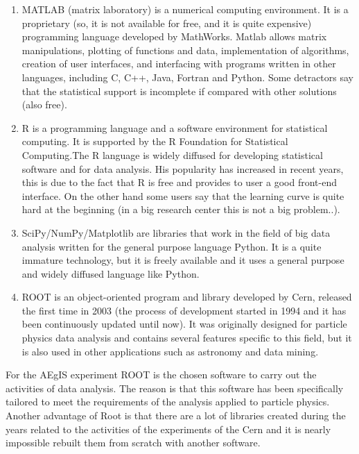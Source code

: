 \begin{enumerate}

\item MATLAB (matrix laboratory) is a numerical computing environment. It is a proprietary (so, it is not available for free, and it is quite expensive) programming language developed by MathWorks. Matlab allows matrix manipulations, plotting of functions and data, implementation of algorithms, creation of user interfaces, and interfacing with programs written in other languages, including C, C++, Java, Fortran and Python. 
Some detractors say that the statistical support is incomplete if compared with other solutions (also free).

\item R is a programming language and a software environment for statistical computing. It is supported by the R Foundation for Statistical Computing.The R language is widely diffused for developing statistical software and for data analysis. His popularity has increased in recent years, this is due to the fact that R is free and provides to user a good front-end interface. On the other hand some users say that the learning curve is quite hard at the beginning (in a big research center this is not a big problem..).  

\item SciPy/NumPy/Matplotlib are libraries that work in the field of big data analysis written for the general purpose language Python. It is a quite immature technology, but it is freely available and it uses a general purpose and widely diffused language like Python.

\item ROOT is an object-oriented program and library developed by Cern, released the first time in 2003 (the process of development started in 1994 and it has been continuously updated until now). It was originally designed for particle physics data analysis and contains several features specific to this field, but it is also used in other applications such as astronomy and data mining. 

\end{enumerate}

For the AEgIS experiment ROOT is the chosen software to carry out the activities of data analysis. The reason is that this software has been specifically tailored to meet the requirements of the analysis applied to particle physics.
Another advantage of Root is that there are a lot of libraries created during the years related to the activities of the experiments of the Cern and it is nearly impossible rebuilt them from scratch with another software.

